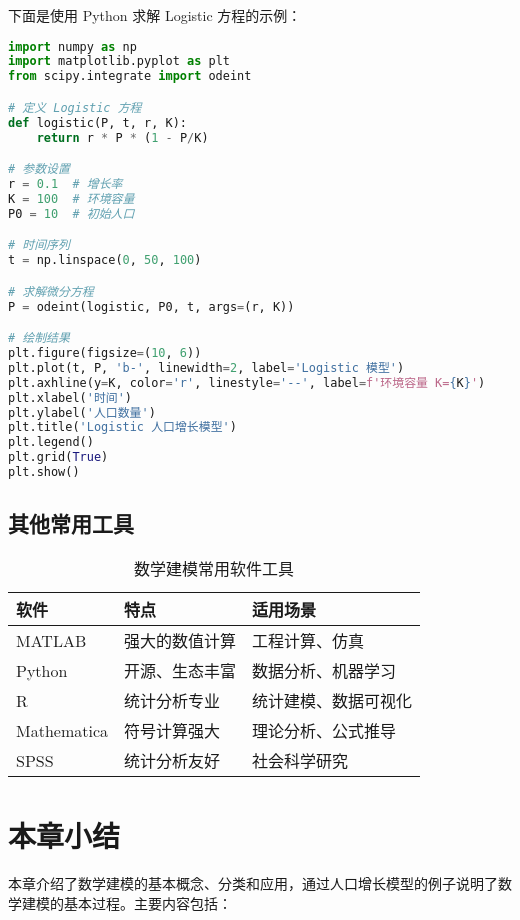 \begin{codebox}[title=Python 示例代码]
下面是使用 Python 求解 Logistic 方程的示例：
\begin{lstlisting}[language=Python]
import numpy as np
import matplotlib.pyplot as plt
from scipy.integrate import odeint

# 定义 Logistic 方程
def logistic(P, t, r, K):
    return r * P * (1 - P/K)

# 参数设置
r = 0.1  # 增长率
K = 100  # 环境容量
P0 = 10  # 初始人口

# 时间序列
t = np.linspace(0, 50, 100)

# 求解微分方程
P = odeint(logistic, P0, t, args=(r, K))

# 绘制结果
plt.figure(figsize=(10, 6))
plt.plot(t, P, 'b-', linewidth=2, label='Logistic 模型')
plt.axhline(y=K, color='r', linestyle='--', label=f'环境容量 K={K}')
plt.xlabel('时间')
plt.ylabel('人口数量')
plt.title('Logistic 人口增长模型')
plt.legend()
plt.grid(True)
plt.show()
\end{lstlisting}
\end{codebox}

\subsection{其他常用工具}

\begin{table}[htbp]
    \centering
    \caption{数学建模常用软件工具}
    \label{tab:modeling-tools}
    \begin{tabular}{@{}lll@{}}
        \toprule
        软件 & 特点 & 适用场景 \\
        \midrule
        MATLAB & 强大的数值计算 & 工程计算、仿真 \\
        Python & 开源、生态丰富 & 数据分析、机器学习 \\
        R & 统计分析专业 & 统计建模、数据可视化 \\
        Mathematica & 符号计算强大 & 理论分析、公式推导 \\
        SPSS & 统计分析友好 & 社会科学研究 \\
        \bottomrule
    \end{tabular}
\end{table}

\section{本章小结}\label{sec:chapter1-summary}

本章介绍了数学建模的基本概念、分类和应用，通过人口增长模型的例子说明了数学建模的基本过程。主要内容包括：

